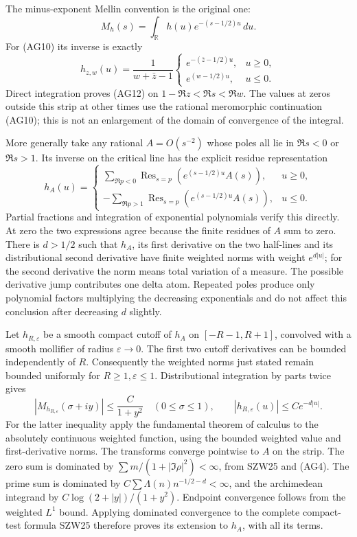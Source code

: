 \documentclass[
  10pt,
  a4paper,
]{article}
\begin{document}
The minus-exponent Mellin convention is the original one: \[
M_h(s)=\int_{\mathbb R}h(u)e^{-(s-1/2)u}\,du.
\tag{AG12}
\] For (AG10) its inverse is exactly \[
h_{z,w}(u)=\frac1{w+\bar z-1}
\begin{cases}e^{-(\bar z-1/2)u},&u\ge0,\\
e^{(w-1/2)u},&u\le0.
\end{cases}
\tag{AG13}
\] Direct integration proves (AG12) on \(1-\Re z<\Re s<\Re w\). The
values at zeros outside this strip at other times use the rational
meromorphic continuation (AG10); this is not an enlargement of the
domain of convergence of the integral.

More generally take any rational \(A=O(s^{-2})\) whose poles all lie in
\(\Re s<0\) or \(\Re s>1\). Its inverse on the critical line has the
explicit residue representation \[
h_A(u)=
\begin{cases}
\displaystyle\sum_{\Re p<0}\operatorname{Res}_{s=p}
\left(e^{(s-1/2)u}A(s)\right),&u\ge0,\\
\displaystyle-\sum_{\Re p>1}\operatorname{Res}_{s=p}
\left(e^{(s-1/2)u}A(s)\right),&u\le0.
\end{cases}
\tag{AG14}
\] Partial fractions and integration of exponential polynomials verify
this directly. At zero the two expressions agree because the finite
residues of \(A\) sum to zero. There is \(d>1/2\) such that \(h_A\), its
first derivative on the two half-lines and its distributional second
derivative have finite weighted norms with weight \(e^{d|u|}\); for the
second derivative the norm means total variation of a measure. The
possible derivative jump contributes one delta atom. Repeated poles
produce only polynomial factors multiplying the decreasing exponentials
and do not affect this conclusion after decreasing \(d\) slightly.

Let \(h_{R,\varepsilon}\) be a smooth compact cutoff of \(h_A\) on
\([-R-1,R+1]\), convolved with a smooth mollifier of radius
\(\varepsilon\to0\). The first two cutoff derivatives can be bounded
independently of \(R\). Consequently the weighted norms just stated
remain bounded uniformly for \(R\ge1,\varepsilon\le1\). Distributional
integration by parts twice gives \[
|M_{h_{R,\varepsilon}}(\sigma+iy)|\le\frac{C}{1+y^2}
\quad(0\le\sigma\le1),\qquad
|h_{R,\varepsilon}(u)|\le Ce^{-d|u|}.
\tag{AG15}
\] For the latter inequality apply the fundamental theorem of calculus
to the absolutely continuous weighted function, using the bounded
weighted value and first-derivative norms. The transforms converge
pointwise to \(A\) on the strip. The zero sum is dominated by
\(\sum m/(1+|\Im\rho|^2)<\infty\), from SZW25 and (AG4). The prime sum
is dominated by \(C\sum\Lambda(n)n^{-1/2-d}<\infty\), and the
archimedean integrand by \(C\log(2+|y|)/(1+y^2)\). Endpoint convergence
follows from the weighted \(L^1\) bound. Applying dominated convergence
to the complete compact-test formula SZW25 therefore proves its
extension to \(h_A\), with all its terms.
\end{document}

